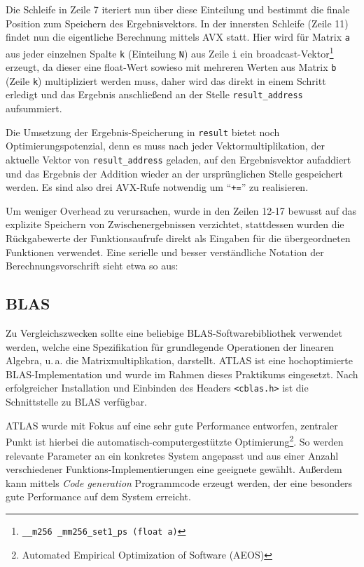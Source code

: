 \documentclass[a4paper,11pt]{scrartcl}
\newcommand{\ua}{\mbox{u.\,a.}\xspace}
\begin{document}
Die Schleife in Zeile 7 iteriert nun über diese Einteilung und bestimmt die finale Position zum 
Speichern des Ergebnisvektors. In der innersten Schleife (Zeile 11) findet nun die eigentliche
Berechnung mittels AVX statt. Hier wird für Matrix \texttt{a} aus jeder einzelnen Spalte
\texttt{k} (Einteilung \texttt{N})
aus Zeile \texttt{i} ein broadcast-Vektor\footnote{\texttt{\_\_m256 \_mm256\_set1\_ps (float a)}}
erzeugt, da dieser eine float-Wert sowieso mit mehreren Werten aus Matrix \texttt{b} 
(Zeile \texttt{k}) multipliziert werden muss, daher wird das direkt in einem Schritt erledigt
und das Ergebnis anschließend an der Stelle \texttt{result\_address} aufsummiert.\newline

Die Umsetzung der Ergebnis-Speicherung in \texttt{result} bietet noch Optimierungspotenzial,
denn es muss nach jeder Vektormultiplikation, der aktuelle Vektor von \texttt{result\_address}
geladen, auf den Ergebnisvektor aufaddiert und das Ergebnis der Addition wieder an der
ursprünglichen Stelle gespeichert werden. Es sind also drei AVX-Rufe notwendig um 
"`\texttt{+=}"' zu realisieren. \newline

Um weniger Overhead zu verursachen, wurde in den Zeilen 12-17 bewusst auf das explizite Speichern von 
Zwischenergebnissen verzichtet, stattdessen wurden die Rückgabewerte der Funktionsaufrufe direkt
als Eingaben für die übergeordneten Funktionen verwendet. Eine serielle und besser verständliche Notation der Berechnungsvorschrift sieht etwa so aus:\newline




\subsection{BLAS}
Zu Vergleichszwecken sollte eine beliebige BLAS-Softwarebibliothek verwendet werden, welche 
eine Spezifikation für grundlegende Operationen der linearen Algebra, \ua die Matrixmultiplikation, darstellt. ATLAS \cite{atlas} ist eine hochoptimierte BLAS-Implementation und wurde im 
Rahmen dieses Praktikums eingesetzt. Nach erfolgreicher
Installation und Einbinden des Headers \texttt{<cblas.h>} ist die Schnittstelle zu BLAS
verfügbar.\newline

ATLAS wurde mit Fokus auf eine sehr gute Performance entworfen, zentraler Punkt ist hierbei die
automatisch-computergestützte Optimierung\footnote{Automated Empirical Optimization of Software (AEOS)}.
So werden relevante Parameter an ein konkretes System angepasst und aus einer Anzahl verschiedener Funktions-Implementierungen eine geeignete gewählt. Außerdem kann mittels \emph{Code generation}
Programmcode erzeugt werden, der eine besonders gute Performance auf dem System erreicht.\newline
\end{document}

